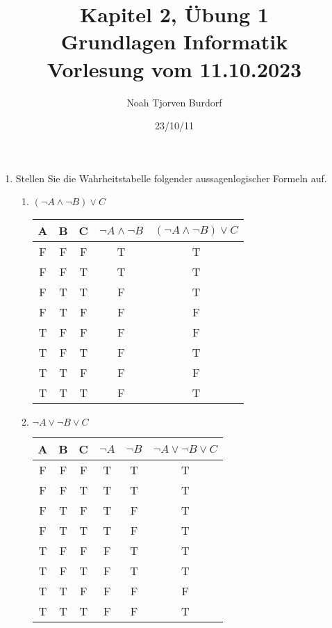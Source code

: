 \documentclass[a4paper,onecolumn,pdftex]{report}
\begin{document}
    \author{Noah Tjorven Burdorf}
    \title{Kapitel 2, \"Ubung 1 \\ Grundlagen Informatik \\ Vorlesung vom 11.10.2023}
    \date{23/10/11}
    \maketitle

    \begin{enumerate}
        \item Stellen Sie die Wahrheitstabelle folgender aussagenlogischer Formeln auf. 
        \begin{enumerate}
            \item $(\neg A \wedge \neg B) \lor  C$ \\
            \begin{tabular}{|c|c|c|c|c|} \hline
                A & B & C & $\neg A \wedge \neg B$ & $(\neg A \wedge \neg B) \lor  C$ \\ \hline
                F&F&F&T&T \\ \hline
                F&F&T&T&T \\ \hline
                F&T&T&F&T \\ \hline
                F&T&F&F&F \\ \hline
                T&F&F&F&F \\ \hline
                T&F&T&F&T \\ \hline
                T&T&F&F&F \\ \hline
                T&T&T&F&T \\ \hline
            \end{tabular}

            \item $\neg A \lor \neg B \lor C$ \\
            \begin{tabular}{|c|c|c|c|c|c|} \hline
                A&B&C&$\neg A$&$\neg B$&$\neg A \lor \neg B \lor C$ \\ \hline
                F&F&F&T&T&T \\ \hline
                F&F&T&T&T&T \\ \hline
                F&T&F&T&F&T \\ \hline
                F&T&T&T&F&T \\ \hline
                T&F&F&F&T&T \\ \hline
                T&F&T&F&T&T \\ \hline
                T&T&F&F&F&F \\ \hline
                T&T&T&F&F&T \\ \hline
            \end{tabular}
        \end{enumerate}


\end{enumerate}
\end{document}
